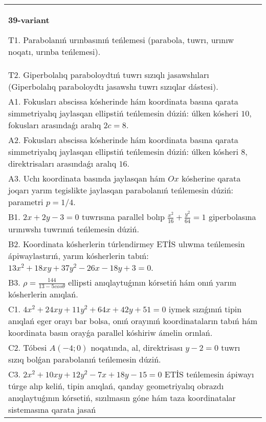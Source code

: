 \documentclass{article}
\begin{document}
\begin{tabular}{m{17cm}}
\textbf{39-variant}
\newline

T1. Parabolanıń urınbasınıń teńlemesi (parabola, tuwrı, urınıw noqatı, urınba teńlemesi).\\

T2. Giperbolalıq paraboloydtıń tuwrı sızıqlı jasawshıları (Giperbolalıq paraboloydtı jasawshı tuwrı sızıqlar dástesi).\\

A1. Fokusları abscissa kósherinde hám koordinata basına qarata simmetriyalıq jaylasqan ellipstiń teńlemesin dúziń: úlken kósheri $10$, fokusları arasındaǵı aralıq $2 c=8$.\\

A2. Fokusları abscissa kósherinde hám koordinata basına qarata simmetriyalıq jaylasqan ellipstiń teńlemesin dúziń: úlken kósheri $8$, direktrisaları arasındaǵı aralıq $16$.\\

A3. Uchı koordinata basında jaylasqan hám $Ox$ kósherine qarata joqarı yarım tegislikte jaylasqan parabolanıń teńlemesin dúziń: parametri $p=1/4$.\\

B1. $2x + 2y - 3 = 0$ tuwrısına parallel bolıp $\frac{x^{2}}{16} + \frac{y^{2}}{64} = 1$ giperbolasına urınıwshı tuwrınıń teńlemesin dúziń.  \\

B2. Koordinata kósherlerin túrlendirmey ETİS ulıwma teńlemesin ápiwaylastırıń, yarım kósherlerin tabıń: $13x^{2} + 18xy + 37y^{2} - 26x - 18y + 3 = 0$.  \\

B3. $\rho = \frac{144}{13 - 5cos\theta}$ ellipsti anıqlaytuǵının kórsetiń hám onıń yarım kósherlerin anıqlań.\\

C1. $4x^{2} + 24xy + 11y^{2} + 64x + 42y + 51 = 0$ iymek sızıǵınıń tipin anıqlań eger orayı bar bolsa, onıń orayınıń koordinataların tabıń hám koordinata basın orayǵa parallel kóshiriw ámelin orınlań.  \\

C2. Tóbesi $A(-4;0)$ noqatında, al, direktrisası $y - 2 = 0$ tuwrı sızıq bolǵan parabolanıń teńlemesin dúziń.\\

C3. $2x^{2} + 10xy + 12y^{2} - 7x + 18y - 15 = 0$ ETİS teńlemesin ápiwayı túrge alıp keliń, tipin anıqlań, qanday geometriyalıq obrazdı anıqlaytuǵının kórsetiń, sızılmasın góne hám taza koordinatalar sistemasına qarata jasań  \\

\end{tabular}
\vspace{1cm}
\end{document}
